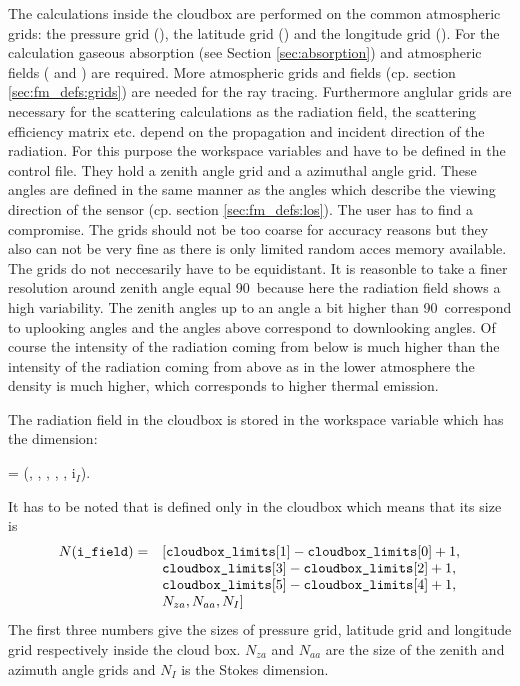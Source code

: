 \label{sec:scattering:grids}
The calculations inside the cloudbox are performed on the common
atmospheric grids: the pressure grid (), the
latitude grid () and the longitude grid
().  For the calculation gaseous absorption (see
Section \ref{sec:absorption}) and atmospheric fields
( and ) are required. More
atmospheric grids and fields (cp. section \ref{sec:fm_defs:grids}) are
needed for the ray tracing.  Furthermore anglular grids are necessary
for the scattering calculations as the radiation field, the scattering
efficiency matrix etc. depend on the propagation and incident
direction of the radiation. For this purpose the workspace variables
 and  have to be
defined in the control file. They hold a zenith angle grid and a
azimuthal angle grid. These angles are defined in the same manner as
the angles which describe the viewing direction of the sensor (cp.
section \ref{sec:fm_defs:los}).  The user has to find a compromise.
The grids should not be too coarse for accuracy reasons but they also
can not be very fine as there is only limited random acces memory
available.  The grids do not neccesarily have to be equidistant. It is
reasonble to take a finer resolution around zenith angle equal
90\degree\ because here the radiation field shows a high variability.
The zenith angles up to an angle a bit higher than 90\degree\ 
correspond to uplooking angles and the angles above correspond to
downlooking angles. Of course the intensity of the radiation coming
from below is much higher than the intensity of the radiation coming
from above as in the lower atmosphere the density is much higher,
which corresponds to higher thermal emission.\newline

\vspace{1ex} The radiation field in the cloudbox is stored in the
workspace variable \wsvindex{i\_field} which has the dimension:
\begin{center}
   =  (\Prs, \Lat, \Lon, \ScaZa,
  \ScaAa, i$_I$).
\end{center}
It has to be noted that  is defined only in the
cloudbox which means that its size is
\[ \begin{array}{rl}
 N(\texttt{i\_field}) =& [\texttt{cloudbox\_limits}[1] - \texttt{cloudbox\_limits}[0] + 1,\\
              &\texttt{cloudbox\_limits}[3] -\texttt{cloudbox\_limits}[2] + 1, \\
              &\texttt{cloudbox\_limits}[5] -\texttt{cloudbox\_limits}[4] + 1,  \\
              & N_{za}, N_{aa}, N_{I} ] 
\end{array}\]
The first three numbers give the sizes of pressure grid, latitude grid
and longitude grid respectively inside the cloud box. $N_{za}$ and
$N_{aa}$ are the size of the zenith and azimuth angle grids and
$N_{I}$ is the Stokes dimension.


